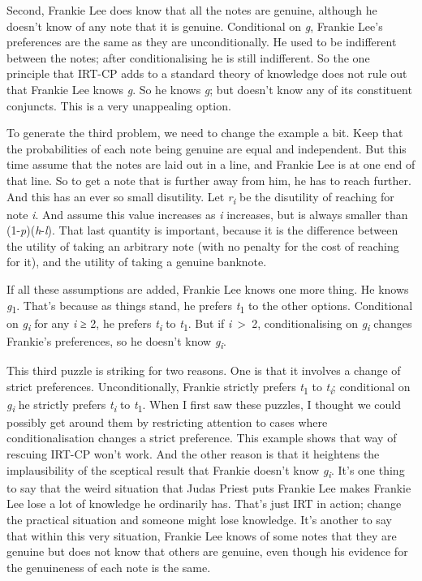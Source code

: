 \documentclass[
  12pt,
  letterpaper,
]{scrbook}
\begin{document}
Second, Frankie Lee does know that all the notes are genuine, although
he doesn't know of any note that it is genuine. Conditional on \emph{g},
Frankie Lee's preferences are the same as they are unconditionally. He
used to be indifferent between the notes; after conditionalising he is
still indifferent. So the one principle that IRT-CP adds to a standard
theory of knowledge does not rule out that Frankie Lee knows \emph{g}.
So he knows \emph{g}; but doesn't know any of its constituent conjuncts.
This is a very unappealing option.

To generate the third problem, we need to change the example a bit. Keep
that the probabilities of each note being genuine are equal and
independent. But this time assume that the notes are laid out in a line,
and Frankie Lee is at one end of that line. So to get a note that is
further away from him, he has to reach further. And this has an ever so
small disutility. Let \emph{r\textsubscript{i}} be the disutility of
reaching for note \emph{i}. And assume this value increases as \emph{i}
increases, but is always smaller than (1-\emph{p})(\emph{h}-\emph{l}).
That last quantity is important, because it is the difference between
the utility of taking an arbitrary note (with no penalty for the cost of
reaching for it), and the utility of taking a genuine banknote.

If all these assumptions are added, Frankie Lee knows one more thing. He
knows \emph{g}\textsubscript{1}. That's because as things stand, he
prefers \emph{t}\textsubscript{1} to the other options. Conditional on
\emph{g\textsubscript{i}} for any \emph{i} ≥ 2, he prefers
\emph{t\textsubscript{i}} to \emph{t}\textsubscript{1}. But if
\emph{i}~\textgreater~2, conditionalising on \emph{g\textsubscript{i}}
changes Frankie's preferences, so he doesn't know
\emph{g\textsubscript{i}}.

This third puzzle is striking for two reasons. One is that it involves a
change of strict preferences. Unconditionally, Frankie strictly prefers
\emph{t}\textsubscript{1} to \emph{t\textsubscript{i}}; conditional on
\emph{g\textsubscript{i}} he strictly prefers \emph{t\textsubscript{i}}
to \emph{t}\textsubscript{1}. When I first saw these puzzles, I thought
we could possibly get around them by restricting attention to cases
where conditionalisation changes a strict preference. This example shows
that way of rescuing IRT-CP won't work. And the other reason is that it
heightens the implausibility of the sceptical result that Frankie
doesn't know \emph{g\textsubscript{i}}. It's one thing to say that the
weird situation that Judas Priest puts Frankie Lee makes Frankie Lee
lose a lot of knowledge he ordinarily has. That's just IRT in action;
change the practical situation and someone might lose knowledge. It's
another to say that within this very situation, Frankie Lee knows of
some notes that they are genuine but does not know that others are
genuine, even though his evidence for the genuineness of each note is
the same.
\end{document}
